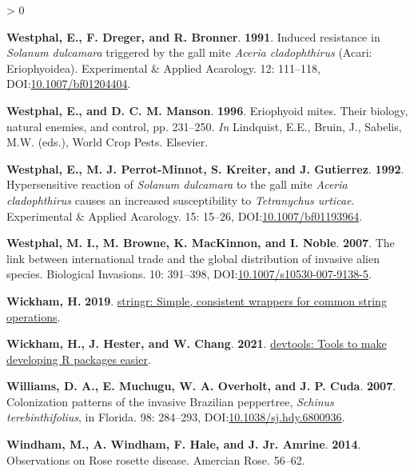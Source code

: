 \documentclass{ufdissertation}[overrideChapters] %
\newlength{\cslhangindent}
\newenvironment{CSLReferences}[2] %
 {%
  \setlength{\parindent}{0pt}
  \ifodd #1 \everypar{\setlength{\hangindent}{\cslhangindent}}\ignorespaces\fi
  \ifnum #2 > 0
  \setlength{\parskip}{#2\baselineskip}
  \fi
 }%
 {}
\begin{document}
{\begin{CSLReferences}{1}{1}
\leavevmode{}%
\textbf{Westphal, E., F. Dreger, and R. Bronner}. \textbf{1991}. Induced resistance in {\emph{Solanum dulcamara}} triggered by the gall mite {\emph{Aceria cladophthirus}} ({Acari}: {Eriophyoidea}). Experimental {\&} Applied Acarology. 12: 111--118, DOI:\href{https://doi.org/10.1007/bf01204404}{10.1007/bf01204404}.

\leavevmode{}%
\textbf{Westphal, E., and D. C. M. Manson}. \textbf{1996}. Eriophyoid mites. Their biology, natural enemies, and control, pp. 231--250. \emph{In} Lindquist, E.E., Bruin, J., Sabelis, M.W. (eds.), World Crop Pests. Elsevier.

\leavevmode{}%
\textbf{Westphal, E., M. J. Perrot-Minnot, S. Kreiter, and J. Gutierrez}. \textbf{1992}. Hypersensitive reaction of {\emph{Solanum dulcamara}} to the gall mite {\emph{Aceria cladophthirus}} causes an increased susceptibility to {\emph{Tetranychus urticae}}. Experimental {\&} Applied Acarology. 15: 15--26, DOI:\href{https://doi.org/10.1007/bf01193964}{10.1007/bf01193964}.

\leavevmode{}%
\textbf{Westphal, M. I., M. Browne, K. MacKinnon, and I. Noble}. \textbf{2007}. The link between international trade and the global distribution of invasive alien species. Biological Invasions. 10: 391--398, DOI:\href{https://doi.org/10.1007/s10530-007-9138-5}{10.1007/s10530-007-9138-5}.

\leavevmode{}%
\textbf{Wickham, H.} \textbf{2019}. \href{https://CRAN.R-project.org/package=stringr}{{stringr}: Simple, consistent wrappers for common string operations}.

\leavevmode{}%
\textbf{Wickham, H., J. Hester, and W. Chang}. \textbf{2021}. \href{https://CRAN.R-project.org/package=devtools}{{devtools}: Tools to make developing {R} packages easier}.

\leavevmode{}%
\textbf{Williams, D. A., E. Muchugu, W. A. Overholt, and J. P. Cuda}. \textbf{2007}. Colonization patterns of the invasive {Brazilian} peppertree, {\emph{Schinus terebinthifolius}}, in {Florida}. 98: 284--293, DOI:\href{https://doi.org/10.1038/sj.hdy.6800936}{10.1038/sj.hdy.6800936}.

\leavevmode{}%
\textbf{Windham, M., A. Windham, F. Hale, and J. Jr. Amrine}. \textbf{2014}. Observations on {Rose rosette disease}. Amercian Rose. 56--62.


\end{CSLReferences}}
\end{document}
